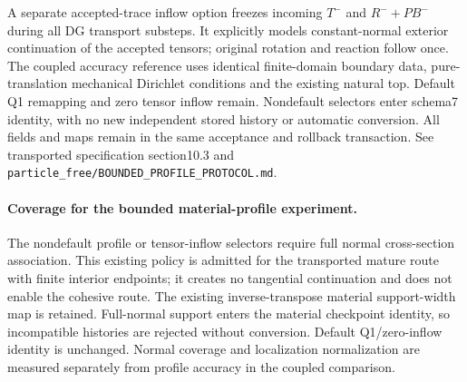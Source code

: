 \documentclass[11pt]{article}
\begin{document}
A separate accepted-trace inflow option freezes incoming $T^-$ and
$R^-+PB^-$ during all DG transport substeps. It explicitly models constant-normal
exterior continuation of the accepted tensors; original rotation and reaction
follow once. The coupled accuracy reference uses identical finite-domain
boundary data, pure-translation mechanical Dirichlet conditions and the existing
natural top. Default Q1 remapping and zero tensor inflow remain. Nondefault
selectors enter schema7 identity, with no new independent stored history or
automatic conversion. All fields and maps remain in the same acceptance and
rollback transaction. See transported specification section10.3 and
\texttt{particle\_free/BOUNDED\_PROFILE\_PROTOCOL.md}.


\paragraph{Coverage for the bounded material-profile experiment.}
The nondefault profile or tensor-inflow selectors require full normal
cross-section association. This existing policy is admitted for the transported
mature route with finite interior endpoints; it creates no tangential
continuation and does not enable the cohesive route. The existing
inverse-transpose material support-width map is retained. Full-normal support
enters the material checkpoint identity, so incompatible histories are rejected
without conversion. Default Q1/zero-inflow identity is unchanged. Normal
coverage and localization normalization are measured separately from profile
accuracy in the coupled comparison.
\end{document}
